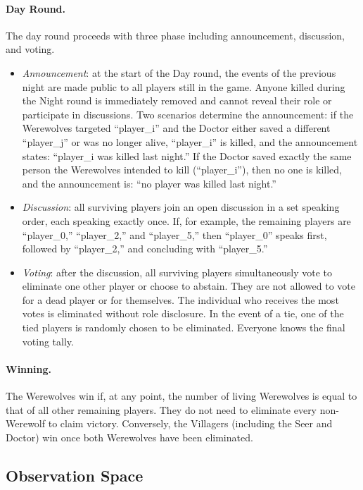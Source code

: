 \paragraph{Day Round.}
The day round proceeds with three phase including announcement, discussion, and voting.
\begin{itemize}
    \item \textit{Announcement}: at the start of the Day round, the events of the previous night are made public to all players still in the game. Anyone killed during the Night round is immediately removed and cannot reveal their role or participate in discussions. Two scenarios determine the announcement: if the Werewolves targeted “player\_i” and the Doctor either saved a different “player\_j” or was no longer alive, “player\_i” is killed, and the announcement states: “player\_i was killed last night.” If the Doctor saved exactly the same person the Werewolves intended to kill (“player\_i”), then no one is killed, and the announcement is: “no player was killed last night.”
    \item \textit{Discussion}: all surviving players join an open discussion in a set speaking order, each speaking exactly once. If, for example, the remaining players are “player\_0,” “player\_2,” and “player\_5,” then “player\_0” speaks first, followed by “player\_2,” and concluding with “player\_5.”
    \item \textit{Voting}: after the discussion, all surviving players simultaneously vote to eliminate one other player or choose to abstain. They are not allowed to vote for a dead player or for themselves. The individual who receives the most votes is eliminated without role disclosure. In the event of a tie, one of the tied players is randomly chosen to be eliminated. Everyone knows the final voting tally.
\end{itemize}

\paragraph{Winning.}
The Werewolves win if, at any point, the number of living Werewolves is equal to that of all other remaining players. They do not need to eliminate every non-Werewolf to claim victory. Conversely, the Villagers (including the Seer and Doctor) win once both Werewolves have been eliminated.


\subsection{Observation Space}


